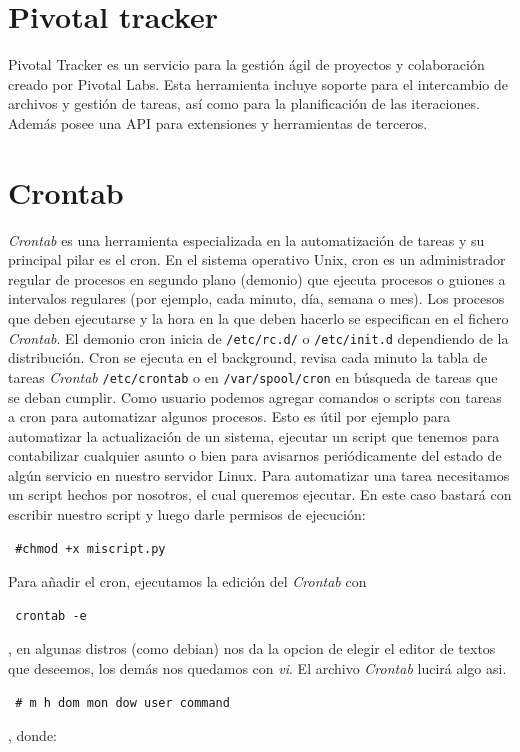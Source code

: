\documentclass[a4paper, 12pt]{book}
\begin{document}
\section{Pivotal tracker}
\label{sec:pivotal}
Pivotal Tracker es un servicio para la gesti\'on \'agil de proyectos y colaboraci\'on creado por Pivotal Labs. Esta herramienta incluye soporte 
para el intercambio de archivos y gesti\'on de tareas, as\'i como para la planificaci\'on de las iteraciones. Adem\'as posee una API para extensiones y 
herramientas de terceros.


\section{Crontab}
\label{sec:crontab}
\textit{Crontab} es una herramienta especializada en la automatizaci\'on de tareas y su principal pilar es el cron. 
En el sistema operativo Unix, cron es un administrador regular de procesos en segundo plano (demonio) que ejecuta procesos o guiones a intervalos 
regulares (por ejemplo, cada minuto, d\'ia, semana o mes). Los procesos que deben ejecutarse y la hora en la que deben hacerlo se especifican en el fichero 
\textit{Crontab}.
El demonio cron inicia de \texttt{/etc/rc.d/} o \texttt{/etc/init.d} dependiendo de la distribuci\'on. Cron se ejecuta en el background, revisa cada minuto la tabla de tareas
\textit{Crontab} \texttt{/etc/crontab} o en \texttt{/var/spool/cron} en b\'usqueda de tareas que se deban cumplir. Como usuario podemos agregar comandos o scripts con tareas a cron 
para automatizar algunos procesos. Esto es \'util por ejemplo para automatizar la actualizaci\'on de un sistema, ejecutar un script que tenemos para 
contabilizar cualquier asunto o bien para avisarnos peri\'odicamente del estado de alg\'un servicio en nuestro servidor Linux.
Para automatizar una tarea necesitamos un script hechos por nosotros, el cual queremos ejecutar. En este caso bastar\'a con escribir nuestro script y 
luego darle permisos de ejecuci\'on: 
  \begin{verbatim} #chmod +x miscript.py \end{verbatim}
Para a\~nadir el cron, ejecutamos la edici\'on del \textit{Crontab} con \begin{verbatim} crontab -e \end{verbatim}, en algunas distros (como debian) nos da la opcion 
de elegir el editor de textos que deseemos, los dem\'as nos quedamos con \textit{vi}. El archivo \textit{Crontab} lucir\'a algo asi. 
  \begin{verbatim} # m h dom mon dow user command \end{verbatim}, donde:
\end{document}
